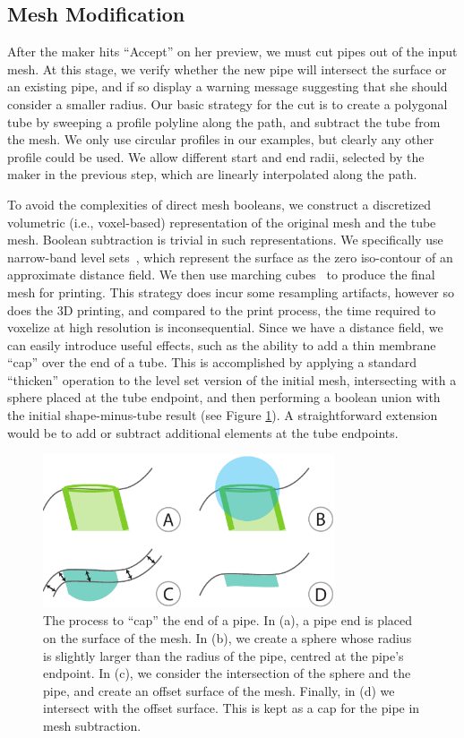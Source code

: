 \subsection{Mesh Modification}
After the maker hits ``Accept'' on her preview, we must cut pipes out of the input mesh.  At this stage, we verify whether the new pipe will intersect the surface or an existing pipe, and if so display a warning message suggesting that she should consider a smaller radius.
Our basic strategy for the cut is to create a polygonal tube by sweeping a profile polyline
along the path, and subtract the tube from the mesh. We only use circular profiles
in our examples, but clearly any other profile could be used. 
We allow different start and end radii, selected by the maker in the previous step, which are linearly interpolated along the path.

To avoid the complexities of direct mesh booleans, we construct a discretized volumetric (i.e., voxel-based) representation of the original mesh and the tube mesh.  Boolean subtraction is trivial in such representations.  We specifically use narrow-band level sets~\cite{Museth04}, which represent the surface as the zero iso-contour of an
approximate distance field.
We then use marching cubes~\cite{Lorensen87} to produce the final mesh for printing.
This strategy does incur some resampling artifacts, however so does the 3D printing, and compared to the print process, the time required to voxelize at high resolution is inconsequential.
Since we have a distance field, we can easily introduce useful effects, such as the
ability to add a thin membrane ``cap'' over the end of a tube. 
This is accomplished by applying a standard ``thicken'' operation to the level set version
of the initial mesh, intersecting with a sphere placed at the tube endpoint, and then performing
a boolean union with the initial shape-minus-tube result (see Figure \ref{fig:cap}).
A straightforward extension would be to add or subtract additional elements at
the tube endpoints.

\begin{figure}[t]
\centering
    \includegraphics[width=3.4in]{figures/cap.pdf}
\caption{The process to ``cap'' the end of a pipe.  In (a), a pipe end is placed on the surface of the mesh.  In (b), we create a sphere whose radius is slightly larger than the radius of the pipe, centred at the pipe's endpoint.  In (c), we consider the intersection of the sphere and the pipe, and create an offset surface of the mesh.  Finally, in (d) we intersect with the offset surface.  This is kept as a cap for the pipe in mesh subtraction.}
\label{fig:cap}
\end{figure}

